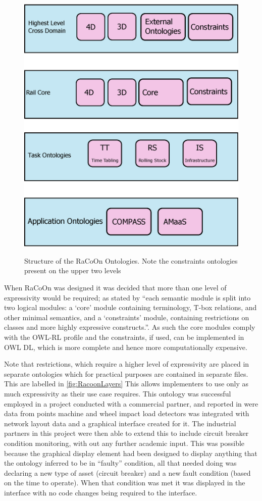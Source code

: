 \begin{figure}[htb]
\myfloatalign
{\includegraphics[width=0.6\linewidth,keepaspectratio]{gfx/RacoonLayers}}  
\caption[Racoon Layers]{Structure of the RaCoOn Ontologies. Note the constraints ontologies present on the upper two levels}
\label{fig:RacoonLayers}
\end{figure}

When RaCoOn was designed it was decided that more than one level of expressivity would be required; as stated by \citet{Tutcher2015} ``each semantic module is split into two logical modules: a ‘core’ module containing terminology, T-box relations, and other minimal semantics, and a ‘constraints’ module, containing restrictions on classes and more highly expressive constructs.''. As such the core modules comply with the OWL-RL profile and the constraints, if used, can be implemented in OWL DL, which is more complete and hence more computationally expensive. 

Note that restrictions, which require a higher level of expressivity are placed in separate ontologies which for practical purposes are contained in separate files. This are labelled  in \autoref{fig:RacoonLayers} This allows implementers to use only as much expressivity as their use case requires. This ontology was successful employed in a project conducted with a commercial partner, and reported in \citet{Tutcher2015a} were data from points machine and wheel impact load detectors was integrated with network layout data and a graphical interface created for it. The industrial partners in this project were then able to extend this to include circuit breaker condition monitoring, with out any further academic input. This was possible because the graphical display element had been designed to display anything that the ontology inferred to be in ``faulty'' condition, all that needed doing was declaring a new type of asset (circuit breaker) and a new fault condition (based on the time to operate). When that condition was met it was displayed in the interface with no code changes being required to the interface. 

